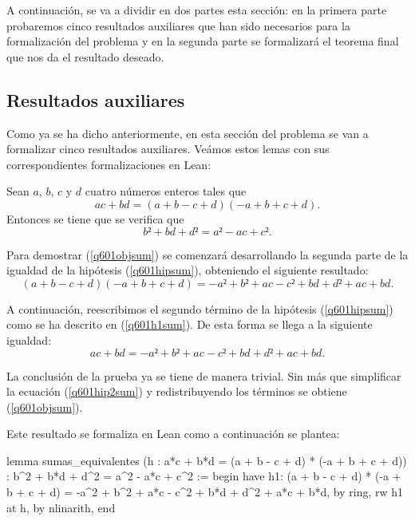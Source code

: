 A continuación, se va a dividir en dos partes esta sección: en la primera
parte probaremos cinco resultados auxiliares que han sido necesarios para
la formalización del problema y en la segunda parte se formalizará el
teorema final que nos da el resultado deseado.

\subsection{Resultados auxiliares}
Como ya se ha dicho anteriormente, en esta sección del problema se van
a formalizar cinco resultados auxiliares. Veámos estos lemas con sus
correspondientes formalizaciones en Lean:

\begin{lema}\label{q601lemasuma}
  Sean \(a\), \(b\), \(c\) y \(d\) cuatro números enteros tales que 
    \begin{equation}\label{q601hipsum}\tag{h}
      ac+bd = (a+b-c+d)(-a+b+c+d).
    \end{equation}
    Entonces se tiene que se verifica que
    \begin{equation}\label{q601objsum}
      b²+bd+d²=a²-ac+c².
    \end{equation}
\end{lema}

\begin{demostracion}
  Para demostrar (\ref{q601objsum}) se comenzará desarrollando la segunda
  parte de la igualdad de la hipótesis (\ref{q601hipsum}), obteniendo el
  siguiente resultado:
  \begin{equation}\tag{h1}\label{q601h1sum}
    (a+b-c+d)(-a+b+c+d)=-a²+b²+ac-c²+bd+d²+ac+bd.
  \end{equation}

  A continuación, reescribimos el segundo término de la hipótesis
  (\ref{q601hipsum}) como se ha descrito en (\ref{q601h1sum}). De esta
  forma se llega a la siguiente igualdad:
  \begin{equation}\label{q601hip2sum}
    ac+bd=-a²+b²+ac-c²+bd+d²+ac+bd.
  \end{equation}

  La conclusión de la prueba ya se tiene de manera trivial. Sin más que
  simplificar la ecuación (\ref{q601hip2sum}) y redistribuyendo los términos
  se obtiene (\ref{q601objsum}).
\end{demostracion}

Este resultado se formaliza en Lean como a continuación se plantea:
\begin{leancode}
lemma sumas_equivalentes
  (h : a*c + b*d = (a + b - c + d) * (-a + b + c + d))
  : b^2 + b*d + d^2 = a^2 - a*c + c^2 :=
begin
  have h1: (a + b - c + d) * (-a + b + c + d) =
           -a^2  + b^2  + a*c - c^2 + b*d + d^2 + a*c + b*d,
    by ring,
  rw h1 at h,
  by nlinarith,
end
\end{leancode}

